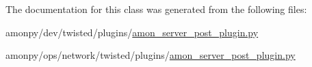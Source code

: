The documentation for this class was generated from the following files\-:\begin{DoxyCompactItemize}
\item 
amonpy/dev/twisted/plugins/\hyperlink{dev_2twisted_2plugins_2amon__server__post__plugin_8py}{amon\-\_\-server\-\_\-post\-\_\-plugin.\-py}\item 
amonpy/ops/network/twisted/plugins/\hyperlink{ops_2network_2twisted_2plugins_2amon__server__post__plugin_8py}{amon\-\_\-server\-\_\-post\-\_\-plugin.\-py}\end{DoxyCompactItemize}
